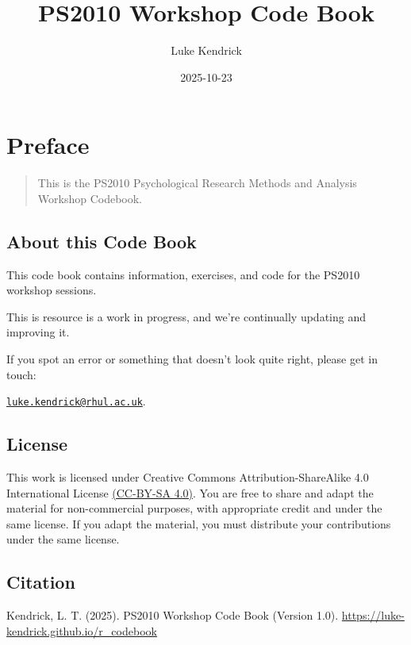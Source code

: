 \documentclass[
]{book}
\title{PS2010 Workshop Code Book}
\author{Luke Kendrick}
\date{2025-10-23}
\let\oldsection\section
\renewcommand{\section}{\needspace{5\baselineskip}\oldsection}
\begin{document}
\maketitle

{
\setcounter{tocdepth}{1}
\tableofcontents
}
\chapter*{Preface}\label{preface}

\begin{quote}
This is the PS2010 Psychological Research Methods and Analysis Workshop Codebook.
\end{quote}

\section{About this Code Book}\label{about-this-code-book}

This code book contains information, exercises, and code for the PS2010 workshop sessions.

This is resource is a work in progress, and we're continually updating and improving it.

If you spot an error or something that doesn't look quite right, please get in touch:

\href{mailto:luke.kendrick@rhul.ac.uk}{\nolinkurl{luke.kendrick@rhul.ac.uk}}.

\section{\texorpdfstring{\textbf{License}}{License}}\label{license}

This work is licensed under Creative Commons Attribution-ShareAlike 4.0 International License \href{https://creativecommons.org/licenses/by-sa/4.0/}{(CC-BY-SA 4.0)}. You are free to share and adapt the material for non-commercial purposes, with appropriate credit and under the same license. If you adapt the material, you must distribute your contributions under the same license.

\section{\texorpdfstring{\textbf{Citation}}{Citation}}\label{citation}

Kendrick, L. T. (2025). PS2010 Workshop Code Book (Version 1.0). \url{https://luke-kendrick.github.io/r_codebook}
\end{document}
